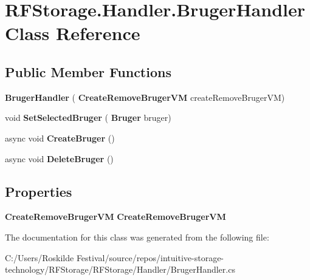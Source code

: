 \section{R\+F\+Storage.\+Handler.\+Bruger\+Handler Class Reference}
\label{class_r_f_storage_1_1_handler_1_1_bruger_handler}
\subsection*{Public Member Functions}
\begin{DoxyCompactItemize}
\item 
\mbox{\label{class_r_f_storage_1_1_handler_1_1_bruger_handler_aa4940c3b376573afb7edf2e0c3e2f048}} 
{\bfseries Bruger\+Handler} (\textbf{ Create\+Remove\+Bruger\+VM} create\+Remove\+Bruger\+VM)
\item 
\mbox{\label{class_r_f_storage_1_1_handler_1_1_bruger_handler_a6192e7e5481d21d9e164a93cc967b09e}} 
void {\bfseries Set\+Selected\+Bruger} (\textbf{ Bruger} bruger)
\item 
\mbox{\label{class_r_f_storage_1_1_handler_1_1_bruger_handler_a04d06b28ea0416d279b94e761d999b7e}} 
async void {\bfseries Create\+Bruger} ()
\item 
\mbox{\label{class_r_f_storage_1_1_handler_1_1_bruger_handler_a66a835f3553eb733ccc83366cfdbe077}} 
async void {\bfseries Delete\+Bruger} ()
\end{DoxyCompactItemize}
\subsection*{Properties}
\begin{DoxyCompactItemize}
\item 
\mbox{\label{class_r_f_storage_1_1_handler_1_1_bruger_handler_af06764b03c4e5322df07015c8c833e05}} 
\textbf{ Create\+Remove\+Bruger\+VM} {\bfseries Create\+Remove\+Bruger\+VM}\hspace{0.3cm}{\ttfamily  [get, set]}
\end{DoxyCompactItemize}


The documentation for this class was generated from the following file\+:\begin{DoxyCompactItemize}
\item 
C\+:/\+Users/\+Roskilde Festival/source/repos/intuitive-\/storage-\/technology/\+R\+F\+Storage/\+R\+F\+Storage/\+Handler/Bruger\+Handler.\+cs\end{DoxyCompactItemize}
